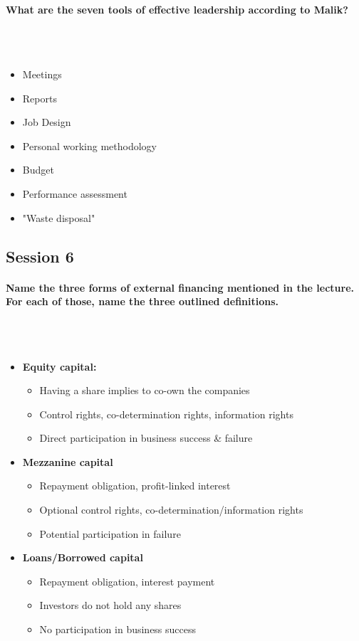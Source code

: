 \documentclass[10pt,a4paper,noendnumber=true]{scrartcl}
\newcommand{\properparagraph}[1]{\paragraph{\textcolor{Emerald}{#1}}\mbox{}\\}
\begin{document}
\properparagraph{What are the seven tools of effective leadership according to Malik?}
\\[-6ex]
\begin{itemize}
	\item Meetings
	\item Reports
	\item Job Design
	\item Personal working methodology
	\item Budget
	\item Performance assessment
	\item "Waste disposal"
\end{itemize}






\newpage
\subsection{Session 6}
\properparagraph{Name the three forms of external financing mentioned in the lecture. For each of those, name the three outlined definitions.}
\\[-6ex]
\begin{itemize}
	\item \textbf{Equity capital:}
	\begin{itemize}
		\item Having a share implies to co-own the companies
		\item Control rights, co-determination rights, information rights
		\item Direct participation in business success \& failure
	\end{itemize}
	\item \textbf{Mezzanine capital}
	\begin{itemize}
		\item Repayment obligation, profit-linked interest
		\item Optional control rights, co-determination/information rights
		\item Potential participation in failure		
	\end{itemize}
	\item \textbf{Loans/Borrowed capital}
	\begin{itemize}
		\item Repayment obligation, interest payment
		\item Investors do not hold any shares
		\item No participation in business success
	\end{itemize}
\end{itemize}
\end{document}
